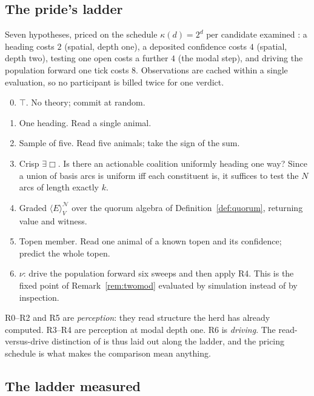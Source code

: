 \documentclass[11pt,a4paper]{article}
\theoremstyle{plain}
\theoremstyle{definition}
\theoremstyle{remark}
\newcommand{\Ebox}{\exists\Box}
\newcommand{\gE}[2]{\langle E\rangle^{#1}_{#2}}
\newcommand{\Nsp}{\mathcal{N}}
\newcommand{\Val}{V}
\begin{document}
\subsection{The pride's ladder}

Seven hypotheses, priced on the schedule $\kappa(d) = 2^d$ per candidate
examined \cite{game}: a heading costs $2$ (spatial, depth one), a deposited
confidence costs $4$ (spatial, depth two), testing one open costs a further $4$
(the modal step), and driving the population forward one tick costs $8$.
Observations are cached within a single evaluation, so no participant is billed
twice for one verdict.

\begin{enumerate}[label=R\arabic*.,leftmargin=2.2em]
\setcounter{enumi}{-1}
\item $\top$. No theory; commit at random.
\item One heading. Read a single animal.
\item Sample of five. Read five animals; take the sign of the sum.
\item Crisp $\Ebox$. Is there an actionable coalition uniformly heading one
      way? Since a union of basis arcs is uniform iff each constituent is, it
      suffices to test the $N$ arcs of length exactly $k$.
\item Graded $\gE{\Nsp}{\Val}$ over the quorum algebra of
      Definition~\ref{def:quorum}, returning value and witness.
\item Topen member. Read one animal of a known topen and its confidence;
      predict the whole topen.
\item $\nu$: drive the population forward six sweeps and then apply R4. This is
      the fixed point of Remark~\ref{rem:twomod} evaluated by simulation
      instead of by inspection.
\end{enumerate}

R0--R2 and R5 are \emph{perception}: they read structure the herd has already
computed. R3--R4 are perception at modal depth one. R6 is \emph{driving}. The
read-versus-drive distinction of \cite{game} is thus laid out along the ladder,
and the pricing schedule is what makes the comparison mean anything.

\subsection{The ladder measured}\label{sec:ladder}
\end{document}
